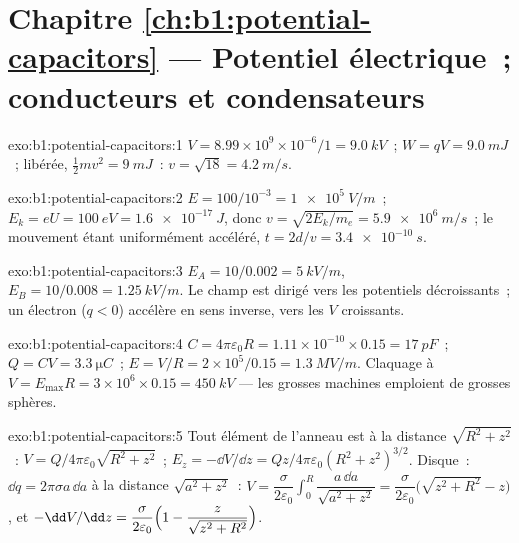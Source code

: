 \section*{Chapitre \ref{ch:b1:potential-capacitors} --- Potentiel électrique~; conducteurs et condensateurs}

\begin{solution}{exo:b1:potential-capacitors:1}
$V = 8.99 \times 10^9 \times 10^{-6}/1 = \qty{9.0}{kV}$~; $W = qV = \qty{9.0}{mJ}$~;
libérée, $\tfrac12mv^2 = \qty{9}{mJ}$~: $v = \sqrt{18} = \qty{4.2}{m/s}$.
\end{solution}

\begin{solution}{exo:b1:potential-capacitors:2}
$E = 100/10^{-3} = \qty{1e5}{V/m}$~; $E_k = eU = \qty{100}{eV} = \qty{1.6e-17}{J}$,
donc $v = \sqrt{2E_k/m_e} = \qty{5.9e6}{m/s}$~; le mouvement étant uniformément
accéléré, $t = 2d/v = \qty{3.4e-10}{s}$.
\end{solution}

\begin{solution}{exo:b1:potential-capacitors:3}
$E_A = 10/0.002 = \qty{5}{kV/m}$, $E_B = 10/0.008 = \qty{1.25}{kV/m}$. Le champ
est dirigé vers les potentiels décroissants~; un électron ($q < 0$) accélère en
sens inverse, vers les $V$ croissants.
\end{solution}

\begin{solution}{exo:b1:potential-capacitors:4}
$C = 4\pi\varepsilon_0R = 1.11 \times 10^{-10} \times 0.15 = \qty{17}{pF}$~; $Q = CV =
\qty{3.3}{\micro C}$~; $E = V/R = 2 \times 10^5/0.15 = \qty{1.3}{MV/m}$. Claquage
à $V = E_{\max}R = 3 \times 10^6 \times 0.15 = \qty{450}{kV}$ --- les grosses
machines emploient de grosses sphères.
\end{solution}

\begin{solution}{exo:b1:potential-capacitors:5}
Tout élément de l'anneau est à la distance $\sqrt{R^2 + z^2}$~: $V =
Q/4\pi\varepsilon_0\sqrt{R^2 + z^2}$~; $E_z = -\dd V/\dd z = Qz/4\pi\varepsilon_0(R^2 +
z^2)^{3/2}$. Disque~: $\dd q = 2\pi\sigma a\,\dd a$ à la distance $\sqrt{a^2 + z^2}$~: $V =
\dfrac{\sigma}{2\varepsilon_0}\displaystyle\int_0^R\dfrac{a\,\dd a}{\sqrt{a^2 + z^2}} =
\dfrac{\sigma}{2\varepsilon_0}\bigl(\sqrt{z^2 + R^2} - z\bigr)$, et $-\dd V/\dd z =
\dfrac{\sigma}{2\varepsilon_0}\Bigl(1 - \dfrac{z}{\sqrt{z^2 + R^2}}\Bigr)$.
\end{solution}

